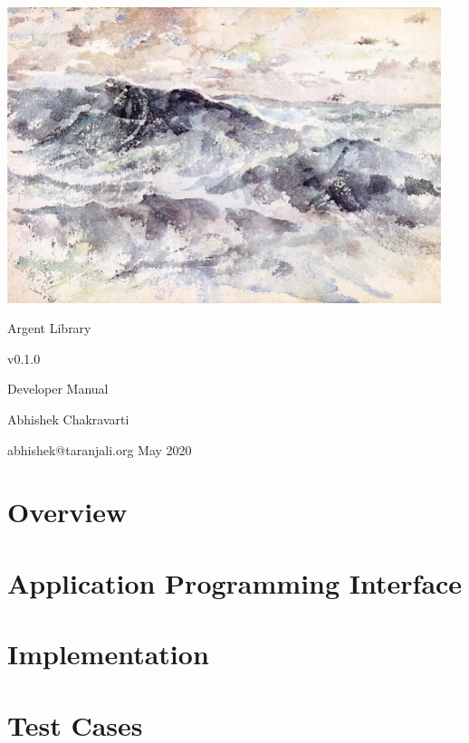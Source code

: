\documentclass[a4paper, 10pt, twocolumn]{report}
\begin{document}
\begin{titlepage}
  \centering
  \includegraphics[width=0.95\textwidth]{the-great-sea.jpg}\par \vspace{1em}
  \Huge Argent Library \par \vspace{0.5em} \large v0.1.0 \par \vspace{0.5em} 
      \LARGE Developer Manual \par \vspace{5em} Abhishek Chakravarti \par
      \vspace{0.5em} \small abhishek@taranjali.org \vfill \large May 2020
\end{titlepage}

\tableofcontents
\listoffigures
\listoftables
\lstlistoflistings

\part{Overview}


\part{Application Programming Interface}


\part{Implementation}
\part{Test Cases}
\begin{appendices}
  
\end{appendices}

\clearpage
\printindex
\end{document}
